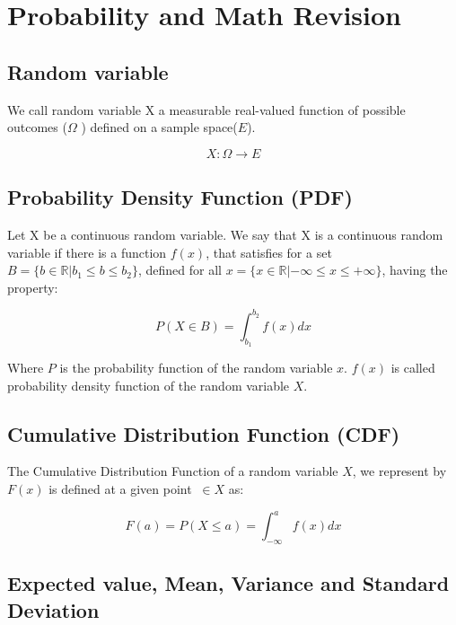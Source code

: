 \chapter{Probability and Math Revision}
\label{ap:revision-probability}

\section{Random variable}
We call random variable X a measurable real-valued  function of possible outcomes ($\Omega$ ) defined on a sample space($E$).

\begin{equation}
	X: \Omega \rightarrow E
\end{equation}

\section{Probability Density Function (PDF)}

Let X be a continuous random variable. We say that X is a continuous random variable if there is a function $f (x) $, that satisfies for a set $B = \{b \in \mathbb{R} | b_ {1} \leq b \leq b_ {2}\} $, defined for all $x = \{x \in \mathbb{R}| - \infty \leq x \leq + \infty\} $, having the property: 

\begin{equation}
	P(X \in B) = \int_{b_{1}}^{b_{2}}f(x) dx 
\end{equation}

Where $P$ is the probability function of the random variable $x$. $f(x)$ is called probability density function of the random variable $X$\cite{ross-probability}. 

\section{Cumulative Distribution Function (CDF)}

The Cumulative Distribution Function of a random variable $X$, we represent by $F (x) $ is defined at a given point $\ \in X$ as\cite{ross-probability}: 

\begin{equation}
F(a) = P(X \leq a) = \int_{- \infty}^{a}f(x) dx 
\end{equation}

\section{Expected value, Mean, Variance and Standard Deviation}

